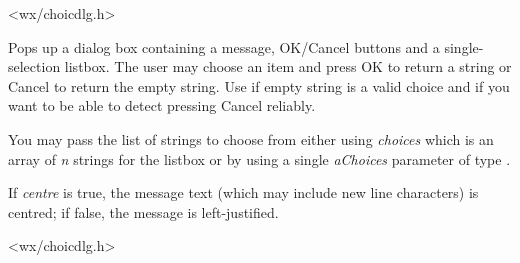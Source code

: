
<wx/choicdlg.h>


\label{wxgetsinglechoice}



Pops up a dialog box containing a message, OK/Cancel buttons and a
single-selection listbox. The user may choose an item and press OK to return a
string or Cancel to return the empty string. Use
 if empty string is a
valid choice and if you want to be able to detect pressing Cancel reliably.

You may pass the list of strings to choose from either using {\it choices}
which is an array of {\it n} strings for the listbox or by using a single
{\it aChoices} parameter of type .

If {\it centre} is true, the message text (which may include new line
characters) is centred; if false, the message is left-justified.


<wx/choicdlg.h>



\label{wxgetsinglechoiceindex}

